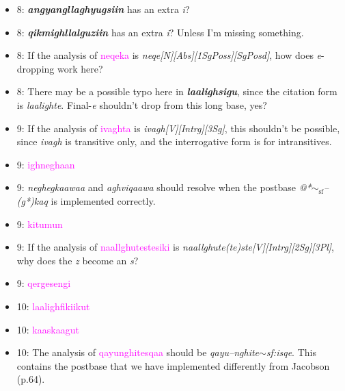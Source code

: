 \documentclass{article}
\begin{document}
\begin{itemize}
\item 8: \textit{\textbf{angyangllaghyugsiin}} has an extra \textit{i}?

\item 8: \textit{\textbf{qikmighllalguziin}} has an extra \textit{i}?
%
Unless I'm missing something.

\item 8: If the analysis of \textcolor{magenta}{neqeka} is \textit{neqe[N][Abs][1SgPoss][SgPosd]}, how does \textit{e}-dropping work here?

\item 8: There may be a possible typo here in \textit{\textbf{laalighsigu}}, since the citation form is \textit{laalighte}.
%
Final-\textit{e} shouldn't drop from this long base, yes?

\item 9: If the analysis of \textcolor{magenta}{ivaghta} is \textit{ivagh[V][Intrg][3Sg]}, this shouldn't be possible, since \textit{ivagh} is transitive only, and the interrogative form is for intransitives.

\item 9: \textcolor{magenta}{ighneghaan}

\item 9: \textit{neghegkaawaa} and \textit{aghviqaawa} should resolve when the postbase \textit{@*$\sim_\text{sf}$--(g*)kaq} is implemented correctly.

\item 9: \textcolor{magenta}{kitumun}

\item 9: If the analysis of \textcolor{magenta}{naallghutestesiki} is \textit{naallghute(te)ste[V][Intrg][2Sg][3Pl]}, why does the \textit{z} become an \textit{s}?

\item 9: \textcolor{magenta}{qergesengi}

\item 10: \textcolor{magenta}{laalighfikiikut}

\item 10: \textcolor{magenta}{kaaskaagut}

\item 10: The analysis of \textcolor{magenta}{qayunghitesqaa} should be \textit{qayu--nghite$\sim$sf:isqe}.
%
This contains the postbase that we have implemented differently from Jacobson (p.64).

\end{itemize}
\end{document}
